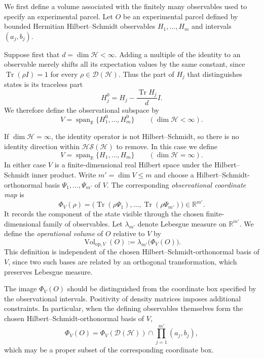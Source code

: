 \documentclass[11pt, onecolumn]{article}
\begin{document}
We first define a volume associated with the finitely many observables
used to specify an experimental parcel. Let $O$ be an experimental
parcel defined by bounded Hermitian Hilbert--Schmidt observables
$H_1,\ldots,H_m$ and intervals $(a_j,b_j)$.

Suppose first that $d=\dim\mathcal H<\infty$. Adding a multiple of the
identity to an observable merely shifts all its expectation values by
the same constant, since $\operatorname{Tr}(\rho I)=1$ for every
$\rho\in\mathcal D(\mathcal H)$. Thus the part of $H_j$ that distinguishes
states is its traceless part
\[
H_j^0
=
H_j-\frac{\operatorname{Tr}H_j}{d}I.
\]
We therefore define the observational subspace by
\[
V
=
\operatorname{span}_{\mathbb R}
\{H_1^0,\ldots,H_m^0\}
\qquad
(\dim\mathcal H<\infty).
\]

If $\dim\mathcal H=\infty$, the identity operator is not
Hilbert--Schmidt, so there is no identity direction within
$\mathcal{HS}(\mathcal H)$ to remove. In this case we define
\[
V
=
\operatorname{span}_{\mathbb R}
\{H_1,\ldots,H_m\}
\qquad
(\dim\mathcal H=\infty).
\]
In either case $V$ is a finite-dimensional real Hilbert space under the
Hilbert--Schmidt inner product. Write $m'=\dim V\leq m$ and choose a
Hilbert--Schmidt-orthonormal basis
$\Psi_1,\ldots,\Psi_{m'}$ of $V$.
The corresponding \emph{observational coordinate map} is
\[
\Phi_V(\rho)
=
\bigl(
\operatorname{Tr}(\rho\Psi_1),\ldots,
\operatorname{Tr}(\rho\Psi_{m'})
\bigr)
\in\mathbb R^{m'}.
\]
It records the component of the state visible through the chosen
finite-dimensional family of observables. Let $\lambda_{m'}$ denote
Lebesgue measure on $\mathbb R^{m'}$. We define the
\emph{operational volume} of $O$ relative to $V$ by
\[
\operatorname{Vol}_{\mathrm{op},V}(O)
:=
\lambda_{m'}\bigl(\Phi_V(O)\bigr).
\]
This definition is independent of the chosen
Hilbert--Schmidt-orthonormal basis of $V$, since two such bases are
related by an orthogonal transformation, which preserves Lebesgue
measure.

The image $\Phi_V(O)$ should be distinguished from the coordinate box
specified by the observational intervals. Positivity of density
matrices imposes additional constraints. In particular, when the
defining observables themselves form the chosen
Hilbert--Schmidt-orthonormal basis of $V$,
\[
\Phi_V(O)
=
\Phi_V(\mathcal D(\mathcal H))
\cap
\prod_{j=1}^{m'}(a_j,b_j),
\]
which may be a proper subset of the corresponding coordinate box.
\end{document}
